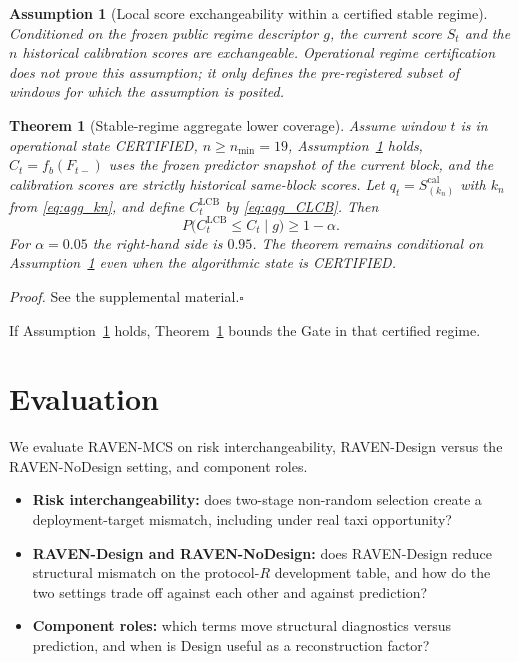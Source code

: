 \documentclass[letterpaper,journal]{IEEEtran}
\newtheorem{theorem}{Theorem}
\newtheorem{assumption}{Assumption}
\begin{document}
\begin{assumption}[Local score exchangeability within a certified stable regime]
\label{ass:score-exchangeability}
Conditioned on the frozen public regime descriptor $g$, the current score
$S_t$ and the $n$ historical calibration scores are exchangeable.  Operational
regime certification does not prove this assumption; it only defines the
pre-registered subset of windows for which the assumption is posited.
\end{assumption}

\begin{theorem}[Stable-regime aggregate lower coverage]
\label{thm:agg-lcb}
Assume window $t$ is in operational state CERTIFIED, $n\ge n_{\min}=19$,
Assumption~\ref{ass:score-exchangeability} holds, $\widehat C_t=f_b(F_{t-})$
uses the frozen predictor snapshot of the current block, and the calibration
scores are strictly historical same-block scores.  Let
$q_t=S_{(k_n)}^{\mathrm{cal}}$ with $k_n$ from \eqref{eq:agg_kn}, and define
$C^{\mathrm{LCB}}_t$ by \eqref{eq:agg_CLCB}.  Then
\begin{equation}
 P\bigl(C^{\mathrm{LCB}}_t\le C_t\mid g\bigr)\ge 1-\alpha.
 \label{eq:agg_thm1}
\end{equation}
For $\alpha=0.05$ the right-hand side is $0.95$.  The theorem remains
conditional on Assumption~\ref{ass:score-exchangeability} even when the
algorithmic state is CERTIFIED.
\end{theorem}

\noindent\emph{Proof.}
See the supplemental material.\hfill$\square$

If Assumption~\ref{ass:score-exchangeability} holds, Theorem~\ref{thm:agg-lcb}
bounds the Gate in that certified regime.

\section{Evaluation}
\label{sec:evaluation}

We evaluate RAVEN-MCS on risk interchangeability, RAVEN-Design versus
the RAVEN-NoDesign setting, and component roles.

\begin{itemize}
    \item \textbf{Risk interchangeability:} does two-stage non-random selection
    create a deployment-target mismatch, including under real taxi opportunity?
    \item \textbf{RAVEN-Design and RAVEN-NoDesign:} does RAVEN-Design reduce
    structural mismatch on the protocol-$R$ development table, and how do the
    two settings trade off against each other and against prediction?
    \item \textbf{Component roles:} which terms move structural diagnostics
    versus prediction, and when is Design useful as a reconstruction factor?
\end{itemize}
\end{document}
